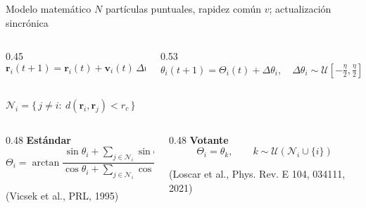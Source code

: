 \documentclass[aspectratio=169,11pt]{beamer}
\newcommand{\cita}[1]{{\scriptsize\color{gris}(#1)}}
\begin{document}
\begin{frame}{Modelo matemático}
    \vspace{0.2em}
    {\small $N$ partículas puntuales, rapidez común $v$; actualización
    \alert{sincrónica}}
    \vspace{-0.2em}
    \begin{columns}[T,onlytextwidth]
        \begin{column}{0.45\textwidth}
            \begin{equation*}
                \mathbf{r}_i(t+1) = \mathbf{r}_i(t) + \mathbf{v}_i(t)\,\Delta t
            \end{equation*}
        \end{column}
        \begin{column}{0.53\textwidth}
            \begin{equation*}
                \theta_i(t+1) = \Theta_i(t) + \Delta\theta_i,
                \quad
                \Delta\theta_i \sim \mathcal{U}\!\left[-\tfrac{\eta}{2},\tfrac{\eta}{2}\right]
            \end{equation*}
        \end{column}
    \end{columns}
    \vspace{0.3em}
    {\small $\mathcal{N}_i=\{\,j\neq i:\ d(\mathbf{r}_i,\mathbf{r}_j)<r_c\,\}$}
    \vspace{1.2em}

    \begin{columns}[T,onlytextwidth]
        \begin{column}{0.48\textwidth}
            {\color{azul}\bfseries Estándar}
            \begin{equation*}
                \Theta_i = \arctan
                \frac{\sin\theta_i + \sum_{j\in\mathcal{N}_i}\sin\theta_j}
                     {\cos\theta_i + \sum_{j\in\mathcal{N}_i}\cos\theta_j}
            \end{equation*}
            \vspace{-0.7em}
            \begin{center}\cita{Vicsek et al., PRL, 1995}\end{center}
        \end{column}\hfill
        \begin{column}{0.48\textwidth}
            {\color{azul}\bfseries Votante}
            \begin{equation*}
                \Theta_i = \theta_k,
                \qquad
                k \sim \mathcal{U}\!\left(\mathcal{N}_i\cup\{i\}\right)
            \end{equation*}
            \vspace{-0.7em}
            \begin{center}\cita{Loscar et al., Phys. Rev. E 104, 034111, 2021}\end{center}
        \end{column}
    \end{columns}
\end{frame}
\end{document}
